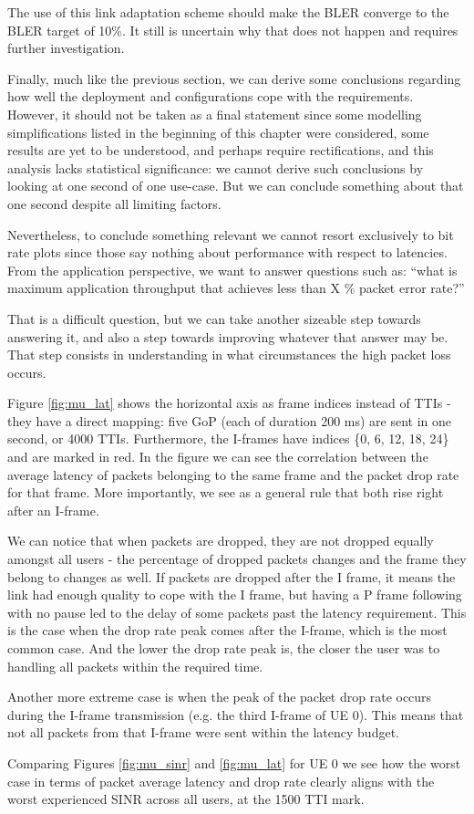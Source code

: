 The use of this link adaptation scheme should make the BLER converge to the BLER target of 10\%. It still is uncertain why that does not happen and requires further investigation.

Finally, much like the previous section, we can derive some conclusions regarding how well the deployment and configurations cope with the requirements. However, it should not be taken as a final statement since some modelling simplifications listed in the beginning of this chapter were considered, some results are yet to be understood, and perhaps require rectifications, and this analysis lacks statistical significance: we cannot derive such conclusions by looking at one second of one use-case. But we can conclude something about that one second despite all limiting factors.

Nevertheless, to conclude something relevant we cannot resort exclusively to bit rate plots since those say nothing about performance with respect to latencies. From the application perspective, we want to answer questions such as: ``what is maximum application throughput that achieves less than X \% packet error rate?''

That is a difficult question, but we can take another sizeable step towards answering it, and also a step towards improving whatever that answer may be. That step consists in understanding in what circumstances the high packet loss occurs. 

Figure \ref{fig:mu_lat} shows the horizontal axis as frame indices instead of TTIs - they have a direct mapping: five GoP (each of duration 200 ms) are sent in one second, or 4000 TTIs. Furthermore, the I-frames have indices \{0, 6, 12, 18, 24\} and are marked in red. In the figure we can see the correlation between the average latency of packets belonging to the same frame and the packet drop rate for that frame. More importantly, we see as a general rule that both rise right after an I-frame.


We can notice that when packets are dropped, they are not dropped equally amongst all users - the percentage of dropped packets changes and the frame they belong to changes as well. If packets are dropped after the I frame, it means the link had enough quality to cope with the I frame, but having a P frame following with no pause led to the delay of some packets past the latency requirement. This is the case when the drop rate peak comes after the I-frame, which is the most common case. And the lower the drop rate peak is, the closer the user was to handling all packets within the required time. 

Another more extreme case is when the peak of the packet drop rate occurs during the I-frame transmission (e.g. the third I-frame of UE 0). This means that not all packets from that I-frame were sent within the latency budget.

Comparing Figures \ref{fig:mu_sinr} and \ref{fig:mu_lat} for UE 0 we see how the worst case in terms of packet average latency and drop rate clearly aligns with the worst experienced SINR across all users, at the 1500 TTI mark.

